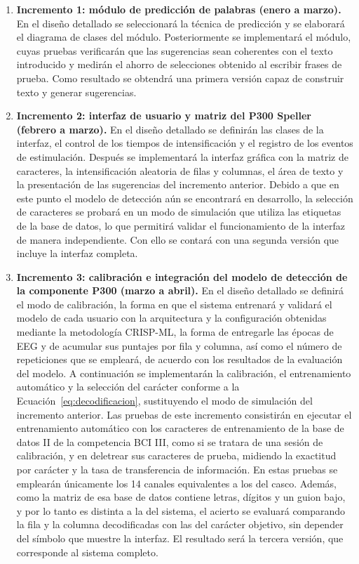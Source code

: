 \begin{enumerate}
  \item \textbf{Incremento 1: módulo de predicción de palabras (enero a marzo).} En el diseño
  detallado se seleccionará la técnica de predicción y se elaborará el diagrama de
  clases del módulo. Posteriormente se implementará el módulo, cuyas pruebas verificarán que las
  sugerencias sean coherentes con el texto introducido y medirán el ahorro de selecciones obtenido
  al escribir frases de prueba. Como resultado se obtendrá una primera versión capaz de construir
  texto y generar sugerencias.
  \item \textbf{Incremento 2: interfaz de usuario y matriz del P300 Speller (febrero a marzo).}
  En el diseño detallado se definirán las clases de la interfaz, el control de los tiempos de
  intensificación y el registro de los eventos de estimulación. Después se implementará la
  interfaz gráfica con la matriz de caracteres, la intensificación aleatoria de filas y columnas,
  el área de texto y la presentación de las sugerencias del incremento anterior. Debido a que en
  este punto el modelo de detección aún se encontrará en desarrollo, la selección de caracteres se
  probará en un modo de simulación que utiliza las etiquetas de la base de datos, lo que permitirá
  validar el funcionamiento de la interfaz de manera independiente. Con ello se contará con una
  segunda versión que incluye la interfaz completa.
  \item \textbf{Incremento 3: calibración e integración del modelo de detección de la componente
  P300 (marzo a abril).} En el diseño detallado se definirá el modo de calibración, la forma en que
  el sistema entrenará y validará el modelo de cada usuario con la arquitectura y la configuración
  obtenidas mediante la metodología CRISP-ML, la forma de entregarle las épocas de EEG y de acumular
  sus puntajes por fila y columna, así como el número de repeticiones que se empleará, de acuerdo
  con los resultados de la evaluación del modelo. A continuación se implementarán la calibración, el
  entrenamiento automático y la selección del carácter conforme a la
  Ecuación~\eqref{eq:decodificacion}, sustituyendo el modo de simulación del incremento anterior.
  Las pruebas de este incremento consistirán en ejecutar el entrenamiento automático con los
  caracteres de entrenamiento de la base de datos II de la competencia BCI III, como si se tratara
  de una sesión de calibración, y en deletrear sus caracteres de prueba, midiendo la exactitud por
  carácter y la tasa de transferencia de información. En estas pruebas se emplearán únicamente los
  14 canales equivalentes a los del casco. Además, como la matriz de esa base de datos contiene
  letras, dígitos y un guion bajo, y por lo tanto es distinta a la del sistema, el acierto se
  evaluará comparando la fila y la columna decodificadas con las del carácter objetivo, sin depender
  del símbolo que muestre la interfaz. El resultado será la tercera versión, que corresponde al
  sistema completo.
\end{enumerate}

